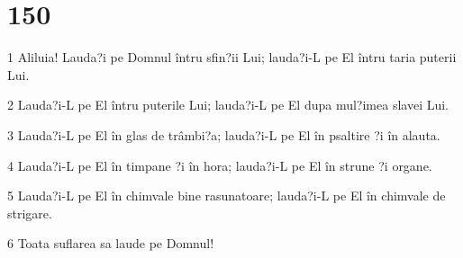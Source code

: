 \chapter{150}

\par 1 Aliluia! Lauda?i pe Domnul întru sfin?ii Lui; lauda?i-L pe El întru taria puterii Lui.
\par 2 Lauda?i-L pe El întru puterile Lui; lauda?i-L pe El dupa mul?imea slavei Lui.
\par 3 Lauda?i-L pe El în glas de trâmbi?a; lauda?i-L pe El în psaltire ?i în alauta.
\par 4 Lauda?i-L pe El în timpane ?i în hora; lauda?i-L pe El în strune ?i organe.
\par 5 Lauda?i-L pe El în chimvale bine rasunatoare; lauda?i-L pe El în chimvale de strigare.
\par 6 Toata suflarea sa laude pe Domnul!


